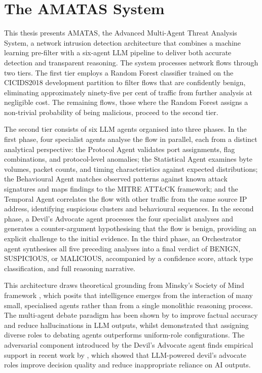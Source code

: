 \documentclass[../main.tex]{subfiles}
\begin{document}
\section{The AMATAS System}
\label{sec:amatas-system}

This thesis presents AMATAS, the Advanced Multi-Agent Threat Analysis System, a network intrusion detection architecture that combines a machine learning pre-filter with a six-agent LLM pipeline to deliver both accurate detection and transparent reasoning. The system processes network flows through two tiers. The first tier employs a Random Forest classifier trained on the CICIDS2018 development partition to filter flows that are confidently benign, eliminating approximately ninety-five per cent of traffic from further analysis at negligible cost. The remaining flows, those where the Random Forest assigns a non-trivial probability of being malicious, proceed to the second tier.

The second tier consists of six LLM agents organised into three phases. In the first phase, four specialist agents analyse the flow in parallel, each from a distinct analytical perspective: the Protocol Agent validates port assignments, flag combinations, and protocol-level anomalies; the Statistical Agent examines byte volumes, packet counts, and timing characteristics against expected distributions; the Behavioural Agent matches observed patterns against known attack signatures and maps findings to the MITRE ATT\&CK framework; and the Temporal Agent correlates the flow with other traffic from the same source IP address, identifying suspicious clusters and behavioural sequences. In the second phase, a Devil's Advocate agent processes the four specialist analyses and generates a counter-argument hypothesising that the flow is benign, providing an explicit challenge to the initial evidence. In the third phase, an Orchestrator agent synthesises all five preceding analyses into a final verdict of BENIGN, SUSPICIOUS, or MALICIOUS, accompanied by a confidence score, attack type classification, and full reasoning narrative.

This architecture draws theoretical grounding from Minsky's Society of Mind framework \autocite{Minsky1986}, which posits that intelligence emerges from the interaction of many small, specialised agents rather than from a single monolithic reasoning process. The multi-agent debate paradigm has been shown by \textcite{Du2023} to improve factual accuracy and reduce hallucinations in LLM outputs, whilst \textcite{Chan2023} demonstrated that assigning diverse roles to debating agents outperforms uniform-role configurations. The adversarial component introduced by the Devil's Advocate agent finds empirical support in recent work by \textcite{Yin2024}, which showed that LLM-powered devil's advocate roles improve decision quality and reduce inappropriate reliance on AI outputs.
\end{document}
